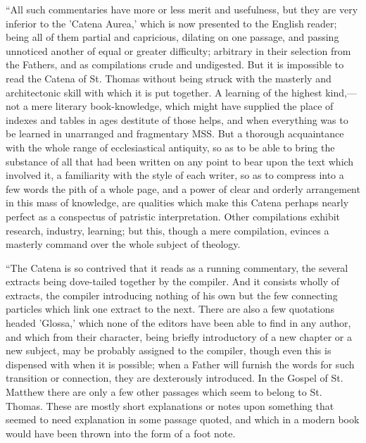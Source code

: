 ``All such commentaries have more or
less merit and usefulness, but they are very inferior to the 'Catena
Aurea,' which is now presented to the English reader; being all of them
partial and capricious, dilating on one passage, and passing unnoticed
another of equal or greater difficulty; arbitrary in their selection
from the Fathers, and as compilations crude and undigested. But it is
impossible to read the Catena of St. Thomas without being struck with
the masterly and architectonic skill with which it is put together. A
learning of the highest kind,—not a mere literary book-knowledge,
which might have supplied the place of indexes and tables in ages
destitute of those helps, and when everything was to be learned in
unarranged and fragmentary MSS. But a thorough acquaintance with the
whole range of ecclesiastical antiquity, so as to be able to bring the
substance of all that had been written on any point to bear upon the
text which involved it, a familiarity with the style of each writer, so
as to compress into a few words the pith of a whole page, and a power of
clear and orderly arrangement in this mass of knowledge, are qualities
which make this Catena perhaps nearly perfect as a conspectus of
patristic interpretation. Other compilations exhibit research, industry,
learning; but this, though a mere compilation, evinces a masterly
command over the whole subject of theology.

``The Catena is so contrived that it
reads as a running commentary, the several extracts being dove-tailed
together by the compiler. And it consists wholly of extracts, the
compiler introducing nothing of his own but the few connecting particles
which link one extract to the next. There are also a few quotations
headed 'Glossa,' which none of the editors have been
able to find in any author, and which from their character, being
briefly introductory of a new chapter or a new subject, may be probably
assigned to the compiler, though even this is dispensed with when it is
possible; when a Father will furnish the words for such transition or
connection, they are dexterously introduced. In the Gospel of St.
Matthew there are only a few other passages which seem to belong to St.
Thomas. These are mostly short explanations or notes upon something that
seemed to need explanation in some passage quoted, and which in a modern
book would have been thrown into the form of a foot note.

